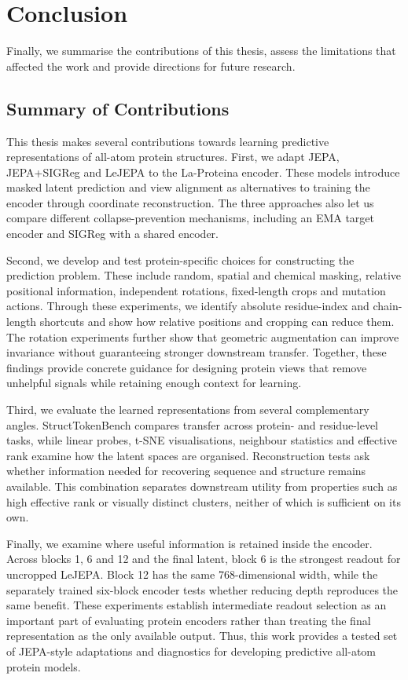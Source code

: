 \section{Conclusion}
\label{sec:conclusion}

Finally, we summarise the contributions of this thesis, assess the limitations that affected the work and provide directions for future research.

\subsection{Summary of Contributions}

This thesis makes several contributions towards learning predictive representations of all-atom protein structures. First, we adapt JEPA, JEPA+SIGReg and LeJEPA to the La-Proteina encoder. These models introduce masked latent prediction and view alignment as alternatives to training the encoder through coordinate reconstruction. The three approaches also let us compare different collapse-prevention mechanisms, including an EMA target encoder and SIGReg with a shared encoder.

Second, we develop and test protein-specific choices for constructing the prediction problem. These include random, spatial and chemical masking, relative positional information, independent rotations, fixed-length crops and mutation actions. Through these experiments, we identify absolute residue-index and chain-length shortcuts and show how relative positions and cropping can reduce them. The rotation experiments further show that geometric augmentation can improve invariance without guaranteeing stronger downstream transfer. Together, these findings provide concrete guidance for designing protein views that remove unhelpful signals while retaining enough context for learning.

Third, we evaluate the learned representations from several complementary angles. StructTokenBench compares transfer across protein- and residue-level tasks, while linear probes, t-SNE visualisations, neighbour statistics and effective rank examine how the latent spaces are organised. Reconstruction tests ask whether information needed for recovering sequence and structure remains available. This combination separates downstream utility from properties such as high effective rank or visually distinct clusters, neither of which is sufficient on its own.

Finally, we examine where useful information is retained inside the encoder. Across blocks 1, 6 and 12 and the final latent, block 6 is the strongest readout for uncropped LeJEPA. Block 12 has the same 768-dimensional width, while the separately trained six-block encoder tests whether reducing depth reproduces the same benefit. These experiments establish intermediate readout selection as an important part of evaluating protein encoders rather than treating the final representation as the only available output. Thus, this work provides a tested set of JEPA-style adaptations and diagnostics for developing predictive all-atom protein models.

